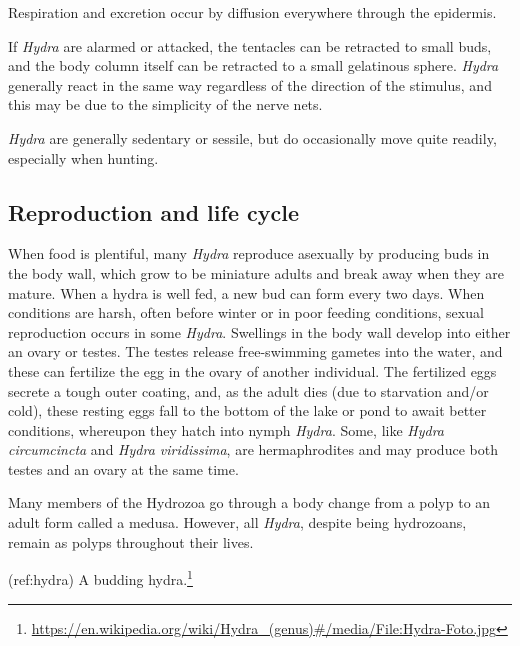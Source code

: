 \documentclass[]{book}
\let\rmarkdownfootnote\footnote%
\def\footnote{\protect\rmarkdownfootnote}
\renewcommand{\href}[2]{#2\footnote{\url{#1}}}
\theoremstyle{definition}
\theoremstyle{definition}
\theoremstyle{definition}
\theoremstyle{remark}
\begin{document}
Respiration and excretion occur by diffusion everywhere through the
epidermis.

If \emph{Hydra} are alarmed or attacked, the tentacles can be retracted
to small buds, and the body column itself can be retracted to a small
gelatinous sphere. \emph{Hydra} generally react in the same way
regardless of the direction of the stimulus, and this may be due to the
simplicity of the nerve nets.

\emph{Hydra} are generally sedentary or sessile, but do occasionally
move quite readily, especially when hunting.

\subsection{Reproduction and life
cycle}\label{reproduction-and-life-cycle}

When food is plentiful, many \emph{Hydra} reproduce asexually by
producing buds in the body wall, which grow to be miniature adults and
break away when they are mature. When a hydra is well fed, a new bud can
form every two days. When conditions are harsh, often before winter or
in poor feeding conditions, sexual reproduction occurs in some
\emph{Hydra}. Swellings in the body wall develop into either an ovary or
testes. The testes release free-swimming gametes into the water, and
these can fertilize the egg in the ovary of another individual. The
fertilized eggs secrete a tough outer coating, and, as the adult dies
(due to starvation and/or cold), these resting eggs fall to the bottom
of the lake or pond to await better conditions, whereupon they hatch
into nymph \emph{Hydra}. Some, like \emph{Hydra circumcincta} and
\emph{Hydra viridissima}, are hermaphrodites and may produce both testes
and an ovary at the same time.

Many members of the Hydrozoa go through a body change from a polyp to an
adult form called a medusa. However, all \emph{Hydra}, despite being
hydrozoans, remain as polyps throughout their lives.

(ref:hydra)
\href{https://en.wikipedia.org/wiki/Hydra_(genus)\#/media/File:Hydra-Foto.jpg}{A
budding hydra.}
\end{document}
